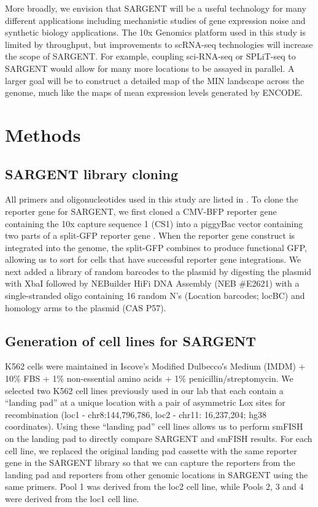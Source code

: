More broadly, we envision that SARGENT will be a useful technology for many different applications including mechanistic studies of gene expression noise and synthetic biology applications. The 10x Genomics platform used in this study is limited by throughput, but improvements to scRNA-seq technologies will increase the scope of SARGENT. For example, coupling sci-RNA-seq \cite{caoj_shendurej:ComprehensiveSinglecell2017} or SPLiT-seq \cite{rosenbergab_seeligg:SinglecellProfiling2018} to SARGENT would allow for many more locations to be assayed in parallel. A larger goal will be to construct a detailed map of the MIN landscape across the genome, much like the maps of mean expression levels generated by ENCODE. 

\section{Methods}
\label{section:cas_methods}

\subsection*{SARGENT library cloning}

All primers and oligonucleotides used in this study are listed in . To clone the reporter gene for SARGENT, we first cloned a CMV-BFP reporter gene containing the 10x capture sequence 1 (CS1) into a piggyBac vector containing two parts of a split-GFP reporter gene \cite{qiz_mitrard:OptimizedBroadly2017}. When the reporter gene construct is integrated into the genome, the split-GFP combines to produce functional GFP, allowing us to sort for cells that have successful reporter gene integrations. We next added a library of random barcodes to the plasmid by digesting the plasmid with XbaI followed by NEBuilder HiFi DNA Assembly (NEB \#E2621) with a single-stranded oligo containing 16 random N’s (Location barcodes; locBC) and homology arms to the plasmid (CAS P57). 

\subsection*{Generation of cell lines for SARGENT}

K562 cells were maintained in Iscove's Modified Dulbecco′s Medium (IMDM) + 10\% FBS + 1\% non-essential amino acids + 1\% penicillin/streptomycin. We selected two K562 cell lines previously used in our lab that each contain a \enquote{landing pad} at a unique location with a pair of asymmetric Lox sites for recombination (loc1 - chr8:144,796,786, loc2 - chr11: 16,237,204; hg38 coordinates). Using these \enquote{landing pad} cell lines allows us to perform smFISH on the landing pad to directly compare SARGENT and smFISH results. For each cell line, we replaced the original landing pad cassette with the same reporter gene in the SARGENT library so that we can capture the reporters from the landing pad and reporters from other genomic locations in SARGENT using the same primers. Pool 1 was derived from the loc2 cell line, while Pools 2, 3 and 4 were derived from the loc1 cell line.

